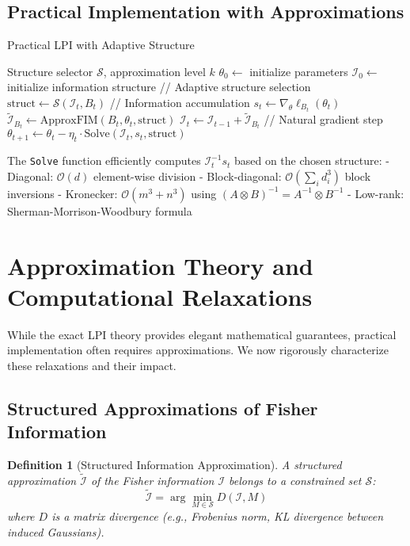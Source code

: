 \documentclass[11pt]{article}
\newtheorem{definition}[theorem]{Definition}
\begin{document}
\subsection{Practical Implementation with Approximations}

\begin{algorithm}[h]
\caption{Practical LPI with Adaptive Structure}
\label{alg:practical_lpi}
\begin{algorithmic}[1]
\Require Structure selector $\mathcal{S}$, approximation level $k$
\State $\theta_0 \gets$ initialize parameters
\State $\mathcal{I}_0 \gets$ initialize information structure
\State // Adaptive structure selection
\State $\text{struct} \gets \mathcal{S}(\mathcal{I}_t, B_t)$ 
\EndIf
\State // Information accumulation
\State $s_t \gets \nabla_\theta \ell_{B_t}(\theta_t)$
\State $\tilde{\mathcal{I}}_{B_t} \gets \text{ApproxFIM}(B_t, \theta_t, \text{struct})$
\State $\mathcal{I}_t \gets \mathcal{I}_{t-1} + \tilde{\mathcal{I}}_{B_t}$
\State // Natural gradient step
\State $\theta_{t+1} \gets \theta_t - \eta_t \cdot \text{Solve}(\mathcal{I}_t, s_t, \text{struct})$
\EndFor
\end{algorithmic}
\end{algorithm}

The \texttt{Solve} function efficiently computes $\mathcal{I}_t^{-1}s_t$ based on the chosen structure:
- Diagonal: $\mathcal{O}(d)$ element-wise division
- Block-diagonal: $\mathcal{O}(\sum_i d_i^3)$ block inversions  
- Kronecker: $\mathcal{O}(m^3 + n^3)$ using $(A \otimes B)^{-1} = A^{-1} \otimes B^{-1}$
- Low-rank: Sherman-Morrison-Woodbury formula

\section{Approximation Theory and Computational Relaxations}

While the exact LPI theory provides elegant mathematical guarantees, practical implementation often requires approximations. We now rigorously characterize these relaxations and their impact.

\subsection{Structured Approximations of Fisher Information}

\begin{definition}[Structured Information Approximation]
A structured approximation $\tilde{\mathcal{I}}$ of the Fisher information $\mathcal{I}$ belongs to a constrained set $\mathcal{S}$:
\begin{equation}
\tilde{\mathcal{I}} = \arg\min_{M \in \mathcal{S}} D(\mathcal{I}, M)
\end{equation}
where $D$ is a matrix divergence (e.g., Frobenius norm, KL divergence between induced Gaussians).
\end{definition}
\end{document}
